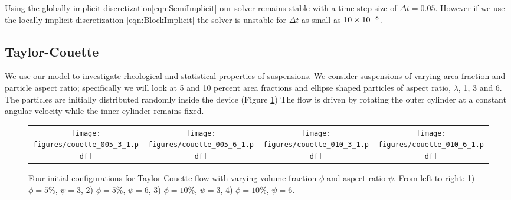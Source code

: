\documentclass[preprint, 10pt]{elsarticle}
\begin{document}
Using the globally implicit discretization\eqref{eqn:SemiImplicit} our solver remains stable with a
time step size of $\Delta t=0.05$. However if we use the locally implicit discretization
\eqref{eqn:BlockImplicit} the solver is unstable for $\Delta t$ as small as $10\times 10^{-8}$.

\FloatBarrier
\subsection{Taylor-Couette}

We use our model to investigate rheological and statistical properties of suspensions. We consider suspensions of varying area
fraction and particle aspect ratio; specifically we will look at 5 and 10
percent area fractions and ellipse shaped particles of aspect ratio, $\lambda$, 1, 3 and 6. The particles are initially distributed randomly
inside the device (Figure \ref{fig:couette_setup}) The flow is driven by rotating the outer cylinder at a constant angular velocity while the inner cylinder remains fixed. 

\begin{figure}[!h]
\begin{center}
\begin{tabular}{c c c c}
\texttt{[image: figures/couette\_005\_3\_1.pdf]} &
\texttt{[image: figures/couette\_005\_6\_1.pdf]} &
\texttt{[image: figures/couette\_010\_3\_1.pdf]} &
\texttt{[image: figures/couette\_010\_6\_1.pdf]}
\end{tabular}
\end{center}
\caption{Four initial configurations for Taylor-Couette flow with varying volume fraction $\phi$ and
aspect ratio $\psi$. From left to right: 1) $\phi=5\%$, $\psi=
3$, 2) $\phi=5\%$, $\psi=6$, 3) $\phi=10\%$, $\psi=3$, 4) $\phi=10\%$,
$\psi=6$.}\label{fig:couette_setup}
\end{figure}
\end{document}
